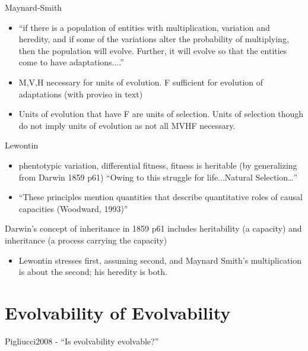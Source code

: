 	Maynard-Smith
	\begin{itemize}
		\item
		
		``if there is a population of entities with multiplication,
		variation and heredity, and if some of the variations alter the
		probability of multiplying, then the population will evolve.
		Further, it will evolve so that the entities come to have
		adaptations....''
		
		\item
		
		M,V,H necessary for units of evolution. F sufficient for evolution
		of adaptations (with proviso in text)
		
		\item
		
		Units of evolution that have F are units of selection. Units of
		selection though do not imply units of evolution as not all MVHF
		necessary.
		
	\end{itemize}
	\item
	
	Lewontin
	\begin{itemize}
		\item
		
		phentotypic variation, differential fitness, fitness is heritable
		(by generalizing from Darwin 1859 p61) ``Owing to this struggle for
		life...Natural Selection\ldots{}''
		
		\item
		
		``These principles mention quantities that describe quantitative
		roles of causal capacities (Woodward, 1993)''
		
	\end{itemize}
	
	Darwin's concept of inheritance in 1859 p61 includes heritability (a
	capacity) and inheritance (a process carrying the capacity)
	
	\begin{itemize}
		\item	
		Lewontin stresses first, assuming second, and Maynard Smith's
		multiplication is about the second; his heredity is both.
		
	\end{itemize}

\section{Evolvability of Evolvability}

Pigliucci2008 - ``Is evolvability evolvable?''

